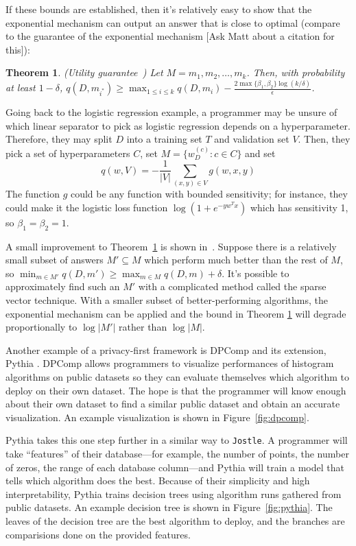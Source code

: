 \documentclass[11pt]{report}
\newtheorem{theorem}{Theorem}
\newcommand{\Jostle}{\texttt{Jostle}}
\begin{document}
If these bounds are established, then it's relatively easy to show that the exponential mechanism can output an answer that is close to optimal (compare to the guarantee of the exponential mechanism [Ask Matt about a citation for this]):
\begin{theorem}\label{thm:dependent_exp}
(Utility guarantee~\cite{Chaudhuri:2013}) Let $M = m_1, m_2, \ldots, m_k$. Then, with probability at least $1-\delta$, $q(D, m_{i^*}) \geq \max_{1\leq i \leq k} q(D, m_i) - \frac{2\max\{\beta_1, \beta_2\}\log(k/\delta)}{\epsilon}$.
\end{theorem}

Going back to the logistic regression example, a programmer may be unsure of which linear separator to pick as logistic regression depends on a hyperparameter. Therefore, they may split $D$ into a training set $T$ and validation set $V$. Then, they pick a set of hyperparameters $C$, set $M = \{w_D^{(c)}: c \in C\}$ and set 
\[
q(w, V) = -\frac{1}{|V|}\sum_{(x, y) \in V} g(w, x, y)
\] 
The function $g$ could be any function with bounded sensitivity; for instance, they could make it the logistic loss function $\log\left(1+e^{-yw^Tx}\right)$ which has sensitivity 1, so $\beta_1 = \beta_2 = 1$.

A small improvement to Theorem~\ref{thm:dependent_exp} is shown in~\cite{Chaudhuri:2014}. Suppose there is a relatively small subset of answers $M' \subseteq M$ which perform much better than the rest of $M$, so $\min_{m \in M'} q(D, m') \geq \max_{m \in M} q(D, m) + \delta$. It's possible to approximately find such an $M'$ with a complicated method called the sparse vector technique. With a smaller subset of better-performing algorithms, the exponential mechanism can be applied and the bound in Theorem \ref{thm:dependent_exp} will degrade proportionally to $\log{|M'|}$ rather than $\log{|M|}$.

Another example of a privacy-first framework is DPComp \cite{Hay:2016} and its extension, Pythia \cite{Kotsogiannis:2017}. DPComp allows programmers to visualize performances of histogram algorithms on public datasets so they can evaluate themselves which algorithm to deploy on their own dataset. The hope is that the programmer will know enough about their own dataset to find a similar public dataset and obtain an accurate visualization. An example visualization is shown in Figure~\ref{fig:dpcomp}.

Pythia takes this one step further in a similar way to \Jostle{}. A programmer will take ``features'' of their database---for example, the number of points, the number of zeros, the range of each database column---and Pythia will train a model that tells which algorithm does the best. Because of their simplicity and high interpretability, Pythia trains decision trees using algorithm runs gathered from public datasets. An example decision tree is shown in Figure~\ref{fig:pythia}. The leaves of the decision tree are the best algorithm to deploy, and the branches are comparisions done on the provided features.
\end{document}

